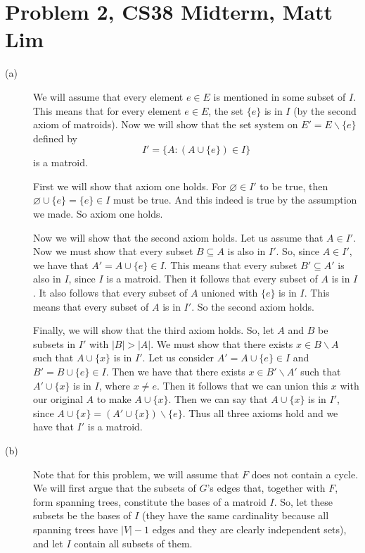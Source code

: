 \documentclass{article}
\begin{document}
\section*{Problem 2, CS38 Midterm, Matt Lim}
\begin{description}
    \item[(a)]
        We will assume that every element $e \in E$ is mentioned in some subset
        of $I$. This means that for every element $e \in E$, the set $\{e\}$
        is in $I$ (by the second axiom of matroids). Now we will show that the set system on
        $E' = E \backslash \{e\}$ defined by
        \[ I' = \{A : (A \cup \{e\}) \in I\} \]
        is a matroid.

        First we will show that axiom one holds. For $\varnothing \in I'$ to be
        true, then $\varnothing \cup \{e\} = \{e\} \in I$ must be true. And this
        indeed is true by the assumption we made. So axiom one holds.

        Now we will show that the second axiom holds. Let us assume that $A \in
        I'$. Now we must show that every subset $B \subseteq A$ is also in $I'$.
        So, since $A \in I'$, we have that $A' = A \cup \{e\} \in I$. This means that
        every subset $B' \subseteq A'$ is also in $I$, since $I$ is a matroid.
        Then it follows that every subset of $A$ is in $I$. It also follows that
        every subset of $A$ unioned with $\{e\}$ is in $I$. This means that
        every subset of $A$ is in $I'$. So the second axiom holds.

        Finally, we will show that the third axiom holds. So, let $A$ and $B$ be
        subsets in $I'$ with $|B| > |A|$. We must show that there exists $x \in
        B \backslash A$ such that $A \cup \{x\}$ is in $I'$. Let us consider
        $A' = A \cup \{e\} \in I$ and $B' = B \cup \{e\} \in I$. Then we have
        that there exists $x \in B' \backslash A'$ such that $A' \cup \{x\}$ is
        in $I$, where $x \neq e$. Then it follows that we can union this $x$
        with our original $A$ to make $A \cup \{x\}$. Then we can say that $A
        \cup \{x\}$ is in $I'$, since $A \cup \{x\} = (A' \cup \{x\}) \backslash
        \{e\}$. Thus all three axioms hold and we have that $I'$ is a matroid.
    \item[(b)]
        Note that for this problem, we will assume that $F$ does not
        contain a cycle. We will first argue that the subsets of $G$'s edges that, together with
        $F$, form spanning trees, constitute the bases of a matroid $I$. So, let
        these subsets be the bases of $I$ (they have the same cardinality
        because all spanning trees have $|V| - 1$ edges and they are clearly
        independent sets), and let $I$ contain all subsets of them.


\end{description}
\end{document}
